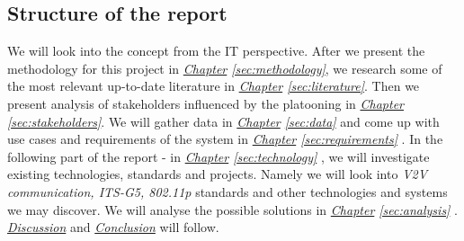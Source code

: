 \subsection{Structure of the report}
We will look into the concept from the IT perspective. After we present the methodology for this project in 
\textit{\hyperref[sec:methodology]{Chapter} \ref{sec:methodology}},
we research some of the most relevant up-to-date literature in 
\textit{\hyperref[sec:literature]{Chapter} \ref{sec:literature}}. 
Then we present analysis of stakeholders influenced by the platooning in 
\textit{\hyperref[sec:stakeholders]{Chapter} \ref{sec:stakeholders}}.
We will gather data in
\textit{\hyperref[sec:data]{Chapter} \ref{sec:data}}
and come up with use cases and requirements of the system in 
\textit{\hyperref[sec:requirements]{Chapter} \ref{sec:requirements}}
. In the following part of the report - in 
\textit{\hyperref[sec:technology]{Chapter} \ref{sec:technology}}
, we will investigate existing technologies, standards and projects. Namely we will look into \emph{V2V communication, ITS-G5, 802.11p} standards and other technologies and systems we may discover. We will analyse the possible solutions in 
\textit{\hyperref[sec:analysis]{Chapter} \ref{sec:analysis}}
. \hyperref[sec:discussion]{\textit{Discussion}} and \hyperref[sec:conclusion]{\textit{Conclusion}} will follow.
% 
% 

